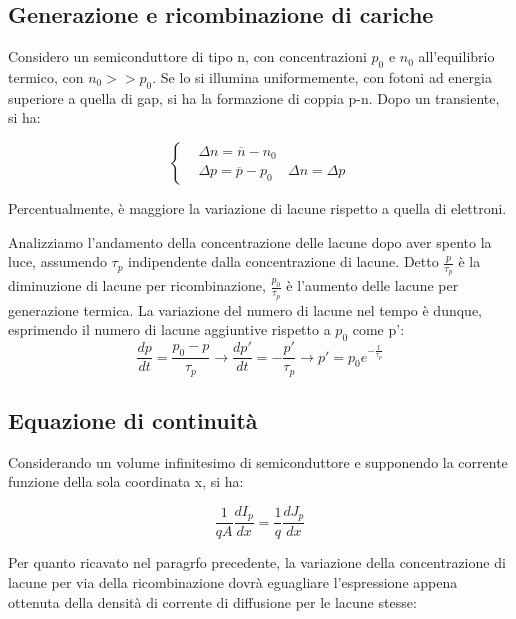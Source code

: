 \documentclass{article}
\begin{document}
\subsection{Generazione e ricombinazione di cariche}
Considero un semiconduttore di tipo n, con concentrazioni $p_0$ e $n_0$ all'equilibrio termico, con $n_0 >> p_0$.
Se lo si illumina uniformemente, con fotoni ad energia superiore a quella di gap, si ha la formazione di coppia p-n.
Dopo un transiente, si ha:

\begin{equation}
    \left\{
    \begin{aligned}
         & \Delta n= \overline{n} - n_0 \\
         & \Delta p= \overline{p} - p_0
         & \Delta n = \Delta p
    \end{aligned}
    \right.
\end{equation}

Percentualmente, è maggiore la variazione di lacune rispetto a quella di elettroni.

Analizziamo l'andamento della concentrazione delle lacune dopo aver spento la luce, assumendo $\tau_p$ indipendente dalla concentrazione di lacune.
Detto $\frac{p}{\tau_p}$ è la diminuzione di lacune per ricombinazione, $\frac{p_0}{\tau_p}$ è l'aumento delle lacune per generazione termica.
La variazione del numero di lacune nel tempo è dunque, esprimendo il numero di lacune aggiuntive rispetto a $p_0$ come p':
\begin{equation}
    \frac{dp}{dt} = \frac{p_0-p}{\tau_p} \rightarrow \frac{dp'}{dt}= -\frac{p'}{\tau_p} \rightarrow p'= p_0 e^{-\frac{t}{\tau_p}}
\end{equation}

\subsection{Equazione di continuità}


Considerando un volume infinitesimo di semiconduttore e supponendo la corrente funzione della sola coordinata x, si ha:

\begin{equation}
    \frac{1}{qA}\frac{dI_p}{dx}=\frac{1}{q}\frac{dJ_p}{dx}
\end{equation}

Per quanto ricavato nel paragrfo precedente, la variazione della concentrazione di lacune per via della ricombinazione dovrà eguagliare l'espressione appena ottenuta della densità di corrente di diffusione
per le lacune stesse:
\end{document}
